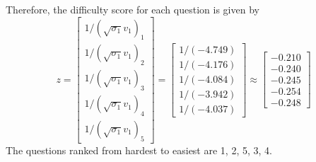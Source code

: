 \begin{homeworkProblem}
\begin{solution}
\begin{itemize}
                Therefore, the difficulty score for each question is given by
                \[
                    z = \begin{bmatrix}
                        1/(\sqrt{\sigma_1} v_1)_1 \\
                        1/(\sqrt{\sigma_1} v_1)_2 \\
                        1/(\sqrt{\sigma_1} v_1)_3 \\
                        1/(\sqrt{\sigma_1} v_1)_4 \\
                        1/(\sqrt{\sigma_1} v_1)_5
                    \end{bmatrix} =
                    \begin{bmatrix}
                        1/(-4.749) \\ 1/(-4.176) \\ 1/(-4.084) \\ 1/(-3.942) \\ 1/(-4.037)
                    \end{bmatrix} \approx
                    \begin{bmatrix}
                        -0.210 \\ -0.240 \\ -0.245 \\ -0.254 \\ -0.248
                    \end{bmatrix}
                \]
                The questions ranked from hardest to easiest are 1, 2, 5, 3, 4.
        \end{itemize}

    \end{solution}

\end{homeworkProblem}